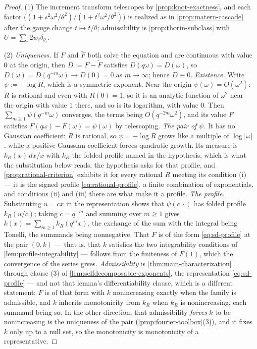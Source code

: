 \begin{proof}
(1) The increment transform telescopes by \ref{prop:knot-exactness}, and each factor
$\bigl((1+s^2\omega^2/\theta^2)/(1+t^2\omega^2/\theta^2)\bigr)$ is realized as in
\ref{prop:matern-cascade} after the gauge change $t \mapsto t/\theta$; admissibility is
\ref{prop:thorin-subclass} with $U = \sum_i 2w_i\delta_{\theta_i}$.

(2) \emph{Uniqueness.} If $F$ and $\tilde F$ both solve the equation and are continuous with
value $0$ at the origin, then $D := F - \tilde F$ satisfies $D(q\omega) = D(\omega)$, so
$D(\omega) = D(q^{-m}\omega) \to D(0) = 0$ as $m \to \infty$; hence $D \equiv 0$.
\emph{Existence.} Write $\psi := -\log R$, which is a symmetric \Levy{} exponent. Near the origin
$\psi(\omega) = O(\omega^2)$: $R$ is rational and even with $R(0) = 1$, so it is an analytic
function of $\omega^2$ near the origin with value $1$ there, and so is its logarithm, with
value $0$. Then
$\sum_{m \ge 1}\psi(q^{-m}\omega)$ converges, the terms being $O(q^{-2m}\omega^2)$, and its
value $F$ satisfies $F(q\omega) - F(\omega) = \psi(\omega)$ by telescoping. \emph{The pair of
$\psi$.} It has no Gaussian coefficient: $R$ is rational, so $\psi = -\log R$ grows like a
multiple of $\log|\omega|$, while a positive Gaussian coefficient forces quadratic growth. Its
\Levy{} measure is $k_R(x)\,dx/x$ with $k_R$ the folded profile named in the hypothesis, which is
what the substitution below reads; the hypothesis asks for that profile, and
\ref{prop:rational-criterion} exhibits it for every rational $R$ meeting its condition (i) --- it
is the signed profile \ref{eq:rational-profile}, a finite combination of exponentials, and
conditions (ii) and (iii) there are what make it a profile. \emph{The profile.}
Substituting $u = cx$ in the representation shows that $\psi(c\,\cdot)$ has folded profile
$k_R(u/c)$; taking $c = q^{-m}$ and summing over $m \ge 1$ gives
$k(x) = \sum_{m\ge1}k_R(q^mx)$, the exchange of the sum with the integral being Tonelli, the
summands being nonnegative. That $F$ is of the form \ref{eq:sd-profile} at the pair $(0,k)$ ---
that is, that $k$ satisfies the two integrability conditions of \ref{lem:profile-integrability}
--- follows from the finiteness of $F(1)$, which the convergence of the series gives.
\emph{Admissibility} is \ref{thm:main-characterization} through clause (3) of
\ref{lem:selfdecomposable-exponents}, the representation \ref{eq:sd-profile} --- and not that
lemma's differentiability clause, which is a different statement: $F$ is of that form with $k$
nonincreasing exactly when the family is admissible, and $k$ inherits monotonicity from $k_R$
when $k_R$ is nonincreasing, each summand being
so. In the other direction, that admissibility \emph{forces} $k$ to be nonincreasing is the
uniqueness of the \Levy{} pair (\ref{prop:fourier-toolbox}(3)), and it fixes $k$ only up to a null
set, so the monotonicity is monotonicity of a representative.
\end{proof}

